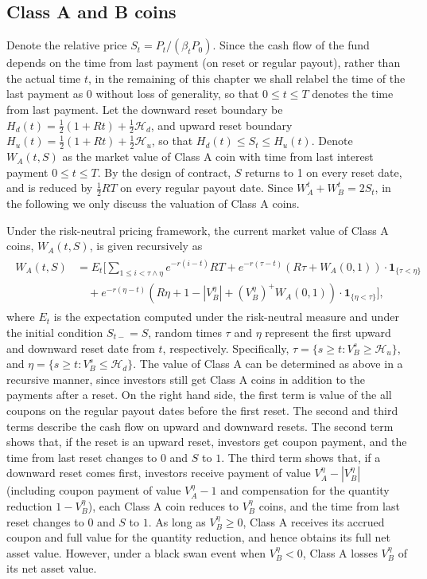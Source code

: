 \documentclass[draft, noinfoline]{ectaart}
\numberwithin{equation}{section}
\theoremstyle{plain}
\begin{document}
\subsection{Class A and B coins}

Denote the relative price $S_t=P_t/(\beta_t P_0)$. Since the cash flow of the fund depends on the time from last payment (on reset or regular payout), rather than the actual time $t$, in the remaining of this chapter we shall relabel the time of the last payment as 0 without loss of generality, so that $0\le t\le T$ denotes the time from last payment. Let the downward reset boundary be $H_{d}(t)=\frac{1}{2}(1+Rt)+\frac{1}{2}\mathcal{H}_{d}$, and upward reset boundary $H_{u}(t)=\frac{1}{2}(1+Rt)+\frac{1}{2}\mathcal{H}_{u}$, so that $H_{d}(t)\le S_t \le H_{u}(t)$. Denote $W_{A}(t,S)$ as the market value of Class A coin with time from last interest payment $0\le t\le T$. By the design of contract, $S$ returns to 1 on every reset date, and is reduced by $\frac{1}{2}RT$ on every regular payout date. Since $W_A^t +W_B^t=2S_t$, in the following we only discuss the valuation of Class A coins.

Under the risk-neutral pricing framework, the current market value of Class A coins, $W_A(t,S)$, is given recursively as
\begin{align}
\begin{split}W_{A}(t,S) & =E_{t}\Bigg[\sum_{1\le i<\tau\land\eta}e^{-r(i-t)}RT+e^{-r(\tau-t)}(R\tau+W_{A}(0,1))\cdot\mathbf{1}_{\{\tau<\eta\}}\\
 & \quad+e^{-r(\eta-t)}(R\eta+1-|V_{B}^{\eta}|+(V_{B}^{\eta})^+W_{A}(0,1))\cdot\mathbf{1}_{\{\eta<\tau\}}\Bigg],
\end{split}
\label{VAL2}
\end{align}
where $E_{t}$ is the expectation computed under the risk-neutral measure and under the initial condition $S_{t-}=S$, random times $\tau$ and $\eta$ represent the first upward and downward reset date from $t$, respectively. Specifically, $\tau=\{s\ge t:V_B^s\ge \mathcal{H}_u\}$, and $\eta=\{s\ge t:V_B^s\le \mathcal{H}_d\}$. The value of Class A can be determined as above in a recursive manner, since investors still get Class A coins in addition to the payments after a reset. On the right hand side, the first term is value of the all coupons on the regular payout dates before the first reset. The second and third terms describe the cash flow on upward and downward resets. The second term shows that, if the reset is an upward reset, investors get coupon payment, and the time from last reset changes to 0 and $S$ to $1$. The third term shows that, if a downward reset comes first, investors receive payment of value $V_{A}^{\eta}-|V_{B}^{\eta}|$ (including coupon payment of value $V_{A}^{\eta}-1$ and compensation for the quantity reduction $1-V_{B}^{\eta}$), each Class A coin reduces to $V_{B}^{\eta}$ coins, and the time from last reset changes to 0 and $S$ to $1$. As long as $V_B^\eta\ge 0$, Class A receives its accrued coupon and full value for the quantity reduction, and hence obtains its full net asset value. However, under a black swan event when $V_B^{\eta}<0$, Class A losses $V_B^{\eta}$ of its net asset value.
\end{document}
